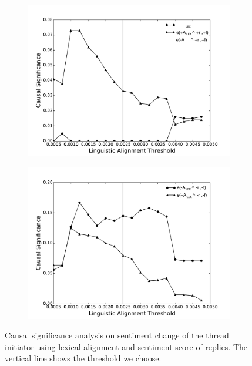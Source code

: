 \documentclass[man,biblatex,floatsintext]{apa6}
\begin{document}
\begin{figure}[!htb]
\begin{subfigure}{.5\textwidth}
  \centering
  \includegraphics[width=\linewidth]{Figures/EnlargeposF05Lex20.pdf}
  \caption{\label{fig:posf05Lex}}
\end{subfigure}
\begin{subfigure}{.5\textwidth}
  \centering
  \includegraphics[width=\linewidth]{Figures/EnlargenegF05Lex20.pdf}
  \caption{\label{fig:negf05Lex}}
\end{subfigure}
\caption{Causal significance analysis on sentiment change of the thread initiator using lexical alignment and sentiment score of replies. The vertical line shows the threshold we choose.}
\label{fig:Robust_Lex}
\end{figure}
\end{document}

